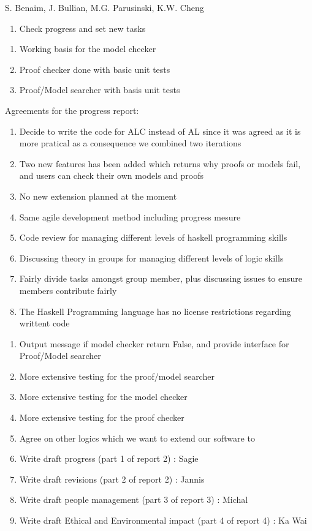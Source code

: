 %
{S. Benaim, J. Bullian, M.G. Parusinski, K.W. Cheng}%
{\begin{enumerate} 
\item Check progress and set new tasks
\end{enumerate} }%
{\begin{enumerate}
\item Working basis for the model checker
\item Proof checker done with basic unit tests
\item Proof/Model searcher with basis unit tests
\end{enumerate}}%
{Agreements for the progress report: \begin{enumerate}
\item Decide to write the code for ALC instead of AL since it was agreed as it is more pratical as a consequence we combined two iterations
\item Two new features has been added which returns why proofs or models fail, and users can check their own models and proofs
\item No new extension planned at the moment
\item Same agile development method including progress mesure
\item Code review for managing different levels of haskell programming skills
\item Discussing theory in groups for managing different levels of logic skills
\item Fairly divide tasks amongst group member, plus discussing issues to ensure members contribute fairly
\item The Haskell Programming language has no license restrictions regarding writtent code
\end{enumerate}}
{\begin{enumerate}
\item Output message if model checker return False, and provide interface for Proof/Model searcher
\item More extensive testing for the proof/model searcher
\item More extensive testing for the model checker
\item More extensive testing for the proof checker
\item Agree on other logics which we want to extend our software to
\item Write draft progress (part 1 of report 2) : Sagie
\item Write draft revisions (part 2 of report 2) : Jannis
\item Write draft people management (part 3 of report 3) : Michal
\item Write draft Ethical and Environmental impact (part 4 of report 4) : Ka Wai
\end{enumerate}}%

